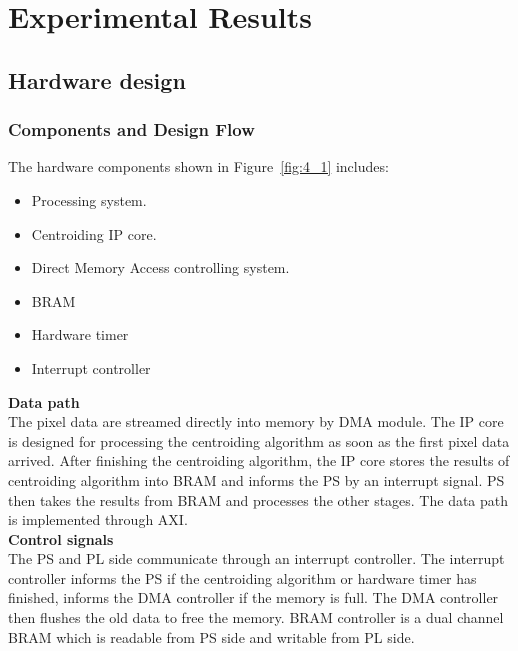 \chapter{Experimental Results}
\label{chap:result}

\section{Hardware design}

\subsection{Components and Design Flow}

The hardware components shown in Figure~\ref{fig:4_1} includes:
\begin{itemize}
    \item Processing system.
    \item Centroiding IP core.
    \item Direct Memory Access controlling system.
    \item BRAM
    \item Hardware timer
    \item Interrupt controller
\end{itemize}


\noindent \textbf{Data path} \\
\noindent The pixel data are streamed directly into memory by DMA module. The IP core is designed for processing the centroiding algorithm as soon as the first pixel data arrived. After finishing the centroiding algorithm, the IP core stores the results of centroiding algorithm into BRAM and informs the PS by an interrupt signal. PS then takes the results from BRAM and processes the other stages. The data path is implemented through AXI. \\

\noindent \textbf{Control signals} \\
\noindent The PS and PL side communicate through an interrupt controller. The interrupt controller informs the PS if the centroiding algorithm or hardware timer has finished, informs the DMA controller if the memory is full. The DMA controller then flushes the old data to free the memory. BRAM controller is a dual channel BRAM which is readable from PS side and writable from PL side. \\


